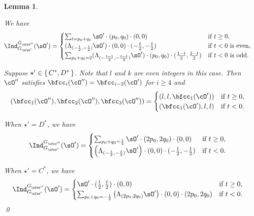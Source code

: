 \documentclass[12pt,a4paper]{amsart}
\numberwithin{equation}{section}
\newtheorem{lem}[thm]{Lemma}
\theoremstyle{remark}
\def\cOp{\cO^{\prime}}
\def\cOpp{\cO^{\prime\prime}}
\begin{document}
\begin{lem}
\begin{enuma}
    We have
    \[
      \indsss(\sOp) =
      \begin{cases}
        \sum_{t=p_0+q_0}\sOp\cdot (p_0,q_0)\cdot (0,0)
           & \text{if $t\geq 0$}, \\
        (\Lambda_{(-\frac{t}{2},-\frac{t}{2})}\sOp) \cdot (0,0)
        \cdot (-\frac{t}{2},-\frac{t}{2})
         & \text{if $t < 0$ is even},  \\
        \sum_{p_0+q_0 = 2}(\Lambda_{(-\frac{t-1}{2},-\frac{t-1}{2})}\sOp) 
        \cdot (p_0,q_0) \cdot (\frac{1-t}{2},\frac{1-t}{2})
            & \text{if $t<0$ is odd}.             \\
      \end{cases}
    \]
    \item Suppose $\star' \in \set{C^*,D^*}$. 
    Note that  $l$ and $k$ are even integers in this case.  
    Then $\cOpp$ satisfies 
    $\bfcc_i(\cOpp)=\bfcc_{i-2}(\cOp)$ for $i\geq 4$ and
    \[
      (\bfcc_1(\cOpp), \bfcc_2(\cOpp),\bfcc_3(\cOpp))
      =\begin{cases}
        (l,l,\bfcc_1(\cOp))     & \text{if $t\geq 0$}, \\
        (\bfcc_1(\cOp),l,l)     & \text{if $t<0$}.             \\
      \end{cases}
    \]

    When $\star' = D^*$, we have
    \[
      \indsss(\sOp) =
      \begin{cases}
        \sum_{p_0+q_0 =\frac{t}{2}}
        \sOp\cdot (2p_0,2q_0)\cdot (0,0)
         & \text{if $t \geq 0$}, \\
        \left(\Lambda_{(-\frac{t}{2},-\frac{t}{2})} \sOp \right)\cdot (0,0) 
        \cdot (-\frac{t}{2},-\frac{t}{2})
         & \text{if $t < 0$}. \\
      \end{cases}
    \]

    When $\star'=C^*$, we have
    \[
      \indsss(\sOp) =
      \begin{cases}
        \sOp\cdot (\frac{t}{2},\frac{t}{2}) \cdot (0,0)
         & \text{if $t \geq 0$}, \\
         \sum_{p_0+q_0 = -\frac{t}{2}}
        \left(\Lambda_{(2p_0,2q_0)} \sOp \right)\cdot (0,0) 
        \cdot (2p_0,2q_0)
         & \text{if $t < 0$}. \\
      \end{cases}
    \]
    \qed
  \end{enuma}
\end{lem}
\end{document}
